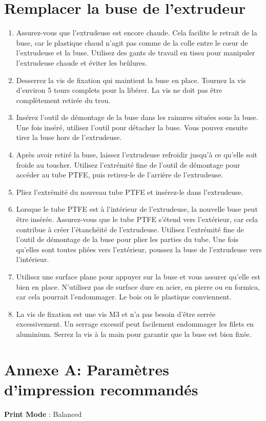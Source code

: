 \documentclass{Thesis}
\begin{document}
\section{Remplacer la buse de l'extrudeur}
\begin{enumerate}
    \item Assurez-vous que l'extrudeuse est encore chaude. Cela facilite le retrait de la buse, car le plastique chaud n'agit pas comme de la colle entre le cœur de l'extrudeuse et la buse. Utilisez des gants de travail en tissu pour manipuler l'extrudeuse chaude et éviter les brûlures.
    \item Desserrez la vis de fixation qui maintient la buse en place. Tournez la vis d'environ 5 tours complets pour la libérer. La vis ne doit pas être complètement retirée du trou.
    \item Insérez l'outil de démontage de la buse dans les rainures situées sous la buse. Une fois inséré, utilisez l'outil pour détacher la buse. Vous pouvez ensuite tirer la buse hors de l'extrudeuse.
    \item Après avoir retiré la buse, laissez l'extrudeuse refroidir jusqu'à ce qu'elle soit froide au toucher. Utilisez l'extrémité fine de l'outil de démontage pour accéder au tube PTFE, puis retirez-le de l'arrière de l'extrudeuse.
    \item Pliez l'extrémité du nouveau tube PTFE et insérez-le dans l'extrudeuse.
    \item Lorsque le tube PTFE est à l'intérieur de l'extrudeuse, la nouvelle buse peut être insérée. Assurez-vous que le tube PTFE s'étend vers l'extérieur, car cela contribue à créer l'étanchéité de l'extrudeuse. Utilisez l'extrémité fine de l'outil de démontage de la buse pour plier les parties du tube. Une fois qu'elles sont toutes pliées vers l'extérieur, poussez la buse de l'extrudeuse vers l'intérieur.
    \item Utilisez une surface plane pour appuyer sur la buse et vous assurer qu'elle est bien en place. N'utilisez pas de surface dure en acier, en pierre ou en formica, car cela pourrait l'endommager. Le bois ou le plastique conviennent.
    \item La vis de fixation est une vis M3 et n'a pas besoin d'être serrée excessivement. Un serrage excessif peut facilement endommager les filets en aluminium. Serrez la vis à la main pour garantir que la buse est bien fixée.
\end{enumerate}

\newpage
\appendix
\section{Annexe A: Paramètres d'impression recommandés}
\label{annexe1}
\textbf{Print Mode} : Balanced
\end{document}

